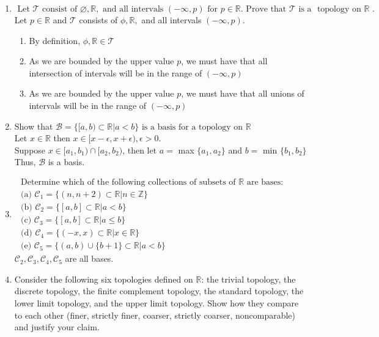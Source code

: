 \documentclass[12pt]{article}
\begin{document}
\begin{enumerate}
	\item[1.9]$ \text { Let } \mathcal { T } \text { consist of } \varnothing, \mathbb { R } , \text { and all intervals } ( - \infty , p ) \text { for } p \in \mathbb { R } . \text { Prove that } \mathcal { T } \text { is a } \text { topology on } \mathbb { R } \text { . } $\\
	Let $ p \in \mathbb{ R } $ and $ \mathcal{ T } $ consists of $ \phi,\mathbb{R}, $ and all intervals $ (-\infty,p) $. 
	\begin{enumerate}
		\item[i] By definition, $ \phi,\mathbb{ R } \in \mathcal{ T } $
		\item[ii] As we are bounded by the upper value $ p $, we must have that all intersection of intervals will be in the range of $ (-\infty,p) $
		\item[iii] As we are bounded by the upper value $ p $, we must have that all unions of intervals will be in the range of $ (-\infty,p) $
	\end{enumerate}
	
	\item[1.10] Show that $ \mathcal { B } = \{ [ a , b ) \subset \mathbb{ R } | a < b \} \text { is a basis for a topology on } \mathbb { R } $\\
		Let $ x\in \mathbb{ R } $ then $ x\in [x-\epsilon,x+\epsilon),\epsilon > 0 $.\\
		Suppose $ x\in [a_1,b_1)\cap[a_2,b_2) $, then let $ a = $ max $ \{a_1,a_2\} $ and $ b = $ min $ \{b_1,b_2\} $\\
		Thus, $ \mathcal{ B } $ is a basis.
	
	\item[1.11]$ \begin{array} { l } { \text { Determine which of the following collections of subsets of } \mathbb { R } \text { are bases: } } \\ { \text { (a) } \mathcal { C } _ { 1 } = \{ ( n , n + 2 ) \subset \mathbb { R } | n \in \mathbb { Z } \} } \\ { \text { (b) } \mathcal { C } _ { 2 } = \{ [ a , b ] \subset \mathbb { R } | a < b \} } \\ { \text { (c) } \mathcal { C } _ { 3 } = \{ [ a , b ] \subset \mathbb { R } | a \leq b \} } \\ { \text { (d) } \mathcal { C } _ { 4 } = \{ ( - x , x ) \subset \mathbb { R } | x \in \mathbb { R } \} } \\ { \text { (e) } \mathcal { C } _ { 5 } = \{ ( a , b ) \cup \{ b + 1 \} \subset \mathbb { R } | a < b \} } \end{array} $\\
	$ \mathcal{C}_2,\mathcal{C}_3,\mathcal{C}_4,\mathcal{C}_5 $ are all bases.
	\item[1.13]Consider the following six topologies defined on $ \mathbb {R}$: the trivial topology, the discrete topology, the finite complement topology, the standard topology, the lower limit topology, and the upper limit topology. Show how they compare to each other (finer, strictly finer, coarser, strictly coarser, noncomparable) and justify your claim.
	

\end{enumerate}
\end{document}
